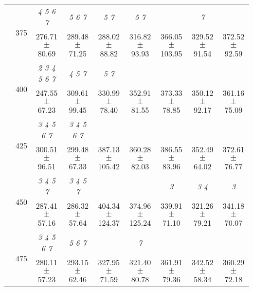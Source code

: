 \begin{table}[h]
{\begin{tabular}{
        ccccccccc}
 & \multirow{2}{*}{375}& \cellcolor[HTML]{EFEFEF} \textit{ 4 5 6 7 }& \cellcolor[HTML]{EFEFEF} \textit{ 5 6 7 }& \cellcolor[HTML]{EFEFEF} \textit{ 5 7 }& \cellcolor[HTML]{EFEFEF} \textit{ 5 7 }& \cellcolor[HTML]{EFEFEF} & \cellcolor[HTML]{EFEFEF} \textit{ 7 }& \cellcolor[HTML]{EFEFEF}  \\ 
 & & \cellcolor[HTML]{EFEFEF} 276.71 $\pm$ 80.69& \cellcolor[HTML]{EFEFEF} 289.48 $\pm$ 71.25& \cellcolor[HTML]{EFEFEF} 288.02 $\pm$ 88.82& \cellcolor[HTML]{EFEFEF} 316.82 $\pm$ 93.93& \cellcolor[HTML]{EFEFEF} 366.05 $\pm$ 103.95& \cellcolor[HTML]{EFEFEF} 329.52 $\pm$ 91.54& \cellcolor[HTML]{EFEFEF} 372.52 $\pm$ 92.59 \\ 
 & \multirow{2}{*}{400}& \textit{ 2 3 4 5 6 7 }& \textit{ 4 5 7 }& \textit{ 5 7 }& & & &  \\ 
 & & 247.55 $\pm$ 67.23& 309.61 $\pm$ 99.45& 330.99 $\pm$ 78.40& 352.91 $\pm$ 81.55& 373.33 $\pm$ 78.85& 350.12 $\pm$ 92.17& 361.16 $\pm$ 75.09 \\ 
 & \multirow{2}{*}{425}& \cellcolor[HTML]{EFEFEF} \textit{ 3 4 5 6 7 }& \cellcolor[HTML]{EFEFEF} \textit{ 3 4 5 6 7 }& \cellcolor[HTML]{EFEFEF} & \cellcolor[HTML]{EFEFEF} & \cellcolor[HTML]{EFEFEF} & \cellcolor[HTML]{EFEFEF} & \cellcolor[HTML]{EFEFEF}  \\ 
 & & \cellcolor[HTML]{EFEFEF} 300.51 $\pm$ 96.51& \cellcolor[HTML]{EFEFEF} 299.48 $\pm$ 67.33& \cellcolor[HTML]{EFEFEF} 387.13 $\pm$ 105.42& \cellcolor[HTML]{EFEFEF} 360.28 $\pm$ 82.03& \cellcolor[HTML]{EFEFEF} 386.55 $\pm$ 83.96& \cellcolor[HTML]{EFEFEF} 352.49 $\pm$ 64.02& \cellcolor[HTML]{EFEFEF} 372.61 $\pm$ 76.77 \\ 
 & \multirow{2}{*}{450}& \textit{ 3 4 5 7 }& \textit{ 3 4 5 7 }& & & \textit{ 3 }& \textit{ 3 4 }& \textit{ 3 } \\ 
 & & 287.41 $\pm$ 57.16& 286.32 $\pm$ 57.64& 404.34 $\pm$ 124.37& 374.96 $\pm$ 125.24& 339.91 $\pm$ 71.10& 321.26 $\pm$ 79.21& 341.18 $\pm$ 70.07 \\ 
 & \multirow{2}{*}{475}& \cellcolor[HTML]{EFEFEF} \textit{ 3 4 5 6 7 }& \cellcolor[HTML]{EFEFEF} \textit{ 5 6 7 }& \cellcolor[HTML]{EFEFEF} & \cellcolor[HTML]{EFEFEF} \textit{ 7 }& \cellcolor[HTML]{EFEFEF} & \cellcolor[HTML]{EFEFEF} & \cellcolor[HTML]{EFEFEF}  \\ 
 & & \cellcolor[HTML]{EFEFEF} 280.11 $\pm$ 57.23& \cellcolor[HTML]{EFEFEF} 293.15 $\pm$ 62.46& \cellcolor[HTML]{EFEFEF} 327.95 $\pm$ 71.59& \cellcolor[HTML]{EFEFEF} 321.40 $\pm$ 80.78& \cellcolor[HTML]{EFEFEF} 361.91 $\pm$ 79.36& \cellcolor[HTML]{EFEFEF} 342.52 $\pm$ 58.34& \cellcolor[HTML]{EFEFEF} 360.29 $\pm$ 72.18 \\ 

\end{tabular}}
\end{table}
